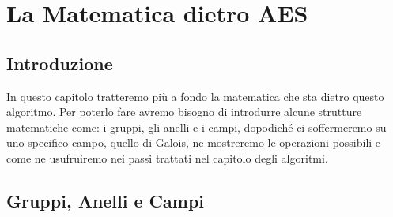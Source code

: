 
\chapter{La Matematica dietro AES}







\section{Introduzione}

      

\textsf{\small In questo capitolo tratteremo più a fondo la matematica che sta dietro questo algoritmo. Per poterlo fare avremo bisogno di introdurre alcune strutture matematiche come: i gruppi, gli anelli e i campi, dopodiché ci soffermeremo su uno specifico campo, quello di Galois, ne mostreremo le operazioni possibili e come ne usufruiremo nei passi trattati nel capitolo degli algoritmi.}


\newpage


\section{Gruppi, Anelli e Campi}

  

